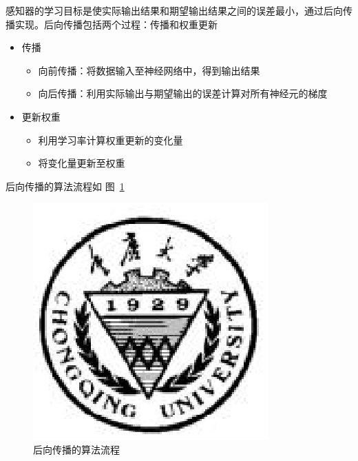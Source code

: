 \documentclass[bachelor,zhspacing]{cqu}  %
\def\tightlist{}
\begin{document}
感知器的学习目标是使实际输出结果和期望输出结果之间的误差最小，通过后向传播实现。后向传播包括两个过程：传播和权重更新

\begin{itemize}
\tightlist
\item
  传播

  \begin{itemize}
  \tightlist
  \item
    向前传播：将数据输入至神经网络中，得到输出结果
  \item
    向后传播：利用实际输出与期望输出的误差计算对所有神经元的梯度
  \end{itemize}
\item
  更新权重

  \begin{itemize}
  \tightlist
  \item
    利用学习率计算权重更新的变化量
  \item
    将变化量更新至权重
  \end{itemize}
\end{itemize}

后向传播的算法流程如 图~\ref{fig:mlp-bp}

\begin{figure}[htbp]
\centering
\includegraphics{./pic/cqu.eps}
\caption{后向传播的算法流程}\label{fig:mlp-bp}
\end{figure}
\end{document}
